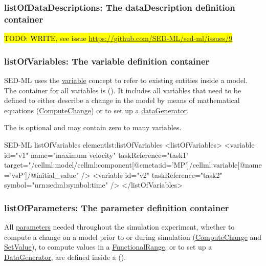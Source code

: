 \subsubsection{listOfDataDescriptions: The dataDescription definition container}
\label{sec:listOfDataDescription}

\hl{TODO: WRITE, see issue \url{https://github.com/SED-ML/sed-ml/issues/9}}


\subsubsection{listOfVariables: The variable definition container}
\label{sec:listOfVariables}

SED-ML uses the \hyperref[class:variable]{variable} concept to refer to existing entities inside a model. The container for all variables is   (). It includes all variables that need to be defined to either describe a change in the model by means of mathematical equations (\hyperref[class:computeChange]{ComputeChange}) or to set up a \hyperref[class:dataGenerator]{dataGenerator}.

%

 The  is optional and may contain zero to many variables. 
%
\begin{myXmlLst}{SED-ML listOfVariables element}{lst:listOfVariables}
<listOfVariables>
 <variable id="v1" name="maximum velocity" taskReference="task1" 
     target="/cellml:model/cellml:component[@cmeta:id='MP']/cellml:variable[@name='vsP']/@initial_value" />
 <variable id="v2" taskReference="task2" symbol="urn:sedml:symbol:time" />
</listOfVariables>
\end{myXmlLst}


\subsubsection{listOfParameters: The parameter definition container}
\label{sec:listOfParameters}
All \hyperref[class:parameter]{parameters} needed throughout the simulation experiment, whether to compute a change on a model prior to or during simulation (\hyperref[class:computeChange]{ComputeChange} and \hyperref[class:setValue]{SetValue}), to compute values in a \hyperref[class:functionalRange]{FunctionalRange}, or to set up a \hyperref[class:dataGenerator]{DataGenerator}, are defined inside a  ().

